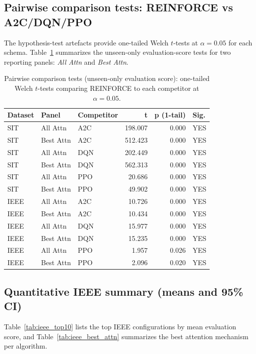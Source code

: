 \documentclass[sn-basic]{sn-jnl} %
\begin{document}
\subsection{Pairwise comparison tests: REINFORCE vs A2C/DQN/PPO}
\label{sec:hypothesis_tests}
The hypothesis-test artefacts provide one-tailed Welch $t$-tests at $\alpha=0.05$ for each schema. Table~\ref{tab:hyp_tests} summarizes the unseen-only evaluation-score tests for two reporting panels: \emph{All Attn} and \emph{Best Attn}.

\begin{table}[t]
	\centering
	\caption{Pairwise comparison tests (unseen-only evaluation score): one-tailed Welch $t$-tests comparing REINFORCE to each competitor at $\alpha=0.05$.}
	\label{tab:hyp_tests}
	\begin{tabular}{l l l r r l}
	\toprule
	\textbf{Dataset} & \textbf{Panel} & \textbf{Competitor} & \textbf{t} & \textbf{p (1-tail)} & \textbf{Sig.}\\
	\midrule
	SIT & All Attn & A2C & 198.007 & 0.000 & YES\\
	SIT & Best Attn & A2C & 512.423 & 0.000 & YES\\
	SIT & All Attn & DQN & 202.449 & 0.000 & YES\\
	SIT & Best Attn & DQN & 562.313 & 0.000 & YES\\
	SIT & All Attn & PPO & 20.686 & 0.000 & YES\\
	SIT & Best Attn & PPO & 49.902 & 0.000 & YES\\
	IEEE & All Attn & A2C & 10.726 & 0.000 & YES\\
	IEEE & Best Attn & A2C & 10.434 & 0.000 & YES\\
	IEEE & All Attn & DQN & 15.977 & 0.000 & YES\\
	IEEE & Best Attn & DQN & 15.235 & 0.000 & YES\\
	IEEE & All Attn & PPO & 1.957 & 0.026 & YES\\
	IEEE & Best Attn & PPO & 2.096 & 0.020 & YES\\
	\bottomrule
	\end{tabular}
\end{table}

\subsection{Quantitative IEEE summary (means and 95\% CI)}
\label{sec:ieee_summary}
Table~\ref{tab:ieee_top10} lists the top IEEE configurations by mean evaluation score, and Table~\ref{tab:ieee_best_attn} summarizes the best attention mechanism per algorithm.
\end{document}
